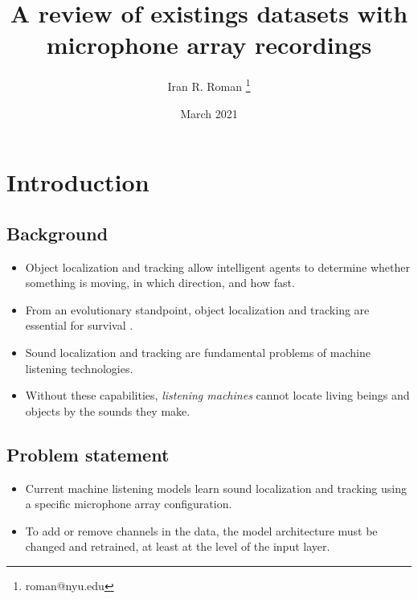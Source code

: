 \documentclass[14pt, oneside]{extarticle}
\title{A review of existings datasets with microphone array recordings}
\author{Iran R. Roman \thanks{roman@nyu.edu}}
\affil{Music and Audio Research Laboratory, New York University}
\date{March 2021}
\begin{document}
\maketitle
\tableofcontents

\vspace{.25in}

\section{Introduction}

\subsection{Background}

\begin{itemize}

\item Object localization and tracking allow intelligent agents to determine whether something is moving, in which direction, and how fast. 

\item From an evolutionary standpoint, object localization and tracking are essential for survival \cite{heffner2018evolution}.

\item Sound localization and tracking are fundamental problems of machine listening technologies.

\item Without these capabilities, {\it listening machines} cannot locate living beings and objects by the sounds they make. 

\end{itemize}

\subsection{Problem statement}

\begin{itemize}

\item Current machine listening models learn sound localization and tracking using a specific microphone array configuration. 

\item To add or remove channels in the data, the model architecture must be changed and retrained, at least at the level of the input layer.

\end{itemize}
\end{document}

